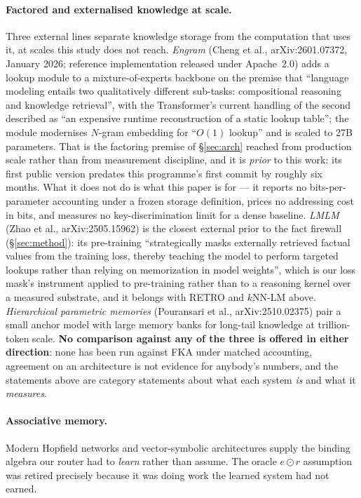 \paragraph{Factored and externalised knowledge at scale.} Three external lines separate knowledge
storage from the computation that uses it, at scales this study does not reach. \emph{Engram}
(Cheng et al., arXiv:2601.07372, January 2026; reference implementation released under Apache~2.0)
adds a lookup module to a mixture-of-experts backbone on the premise that ``language modeling
entails two qualitatively different sub-tasks: compositional reasoning and knowledge retrieval'',
with the Transformer's current handling of the second described as ``an expensive runtime
reconstruction of a static lookup table''; the module modernises $N$-gram embedding for ``$O(1)$
lookup'' and is scaled to 27B parameters. That is the factoring premise of \S\ref{sec:arch} reached
from production scale rather than from measurement discipline, and it is \emph{prior} to this work:
its first public version predates this programme's first commit by roughly six months. What it does
not do is what this paper is for --- it reports no bits-per-parameter accounting under a frozen
storage definition, prices no addressing cost in bits, and measures no key-discrimination limit for
a dense baseline. \emph{LMLM} (Zhao et al., arXiv:2505.15962) is the closest external prior to the
fact firewall (\S\ref{sec:method}): its pre-training ``strategically masks externally retrieved
factual values from the training loss, thereby teaching the model to perform targeted lookups rather
than relying on memorization in model weights'', which is our loss mask's instrument applied to
pre-training rather than to a reasoning kernel over a measured substrate, and it belongs with RETRO
and $k$NN-LM above. \emph{Hierarchical parametric memories} (Pouransari et al., arXiv:2510.02375)
pair a small anchor model with large memory banks for long-tail knowledge at trillion-token scale.
\textbf{No comparison against any of the three is offered in either direction}: none has been run
against FKA under matched accounting, agreement on an architecture is not evidence for anybody's
numbers, and the statements above are category statements about what each system \emph{is} and what
it \emph{measures}.

\paragraph{Associative memory.} Modern Hopfield networks and vector-symbolic architectures supply
the binding algebra our router had to \emph{learn} rather than assume. The oracle $e \odot r$
assumption was retired precisely because it was doing work the learned system had not earned.

